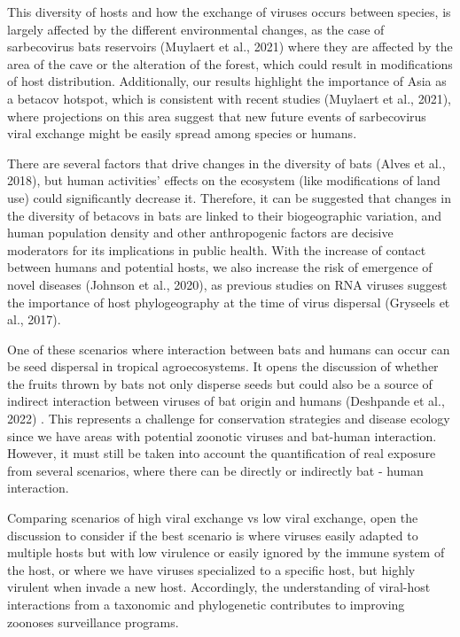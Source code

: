 \documentclass[10pt,oneside]{article}
\begin{document}
This diversity of hosts and how the exchange of viruses occurs between
species, is largely affected by the different environmental changes, as
the case of sarbecovirus bats reservoirs (Muylaert et al., 2021) where
they are affected by the area of the cave or the alteration of the
forest, which could result in modifications of host distribution.
Additionally, our results highlight the importance of Asia as a betacov
hotspot, which is consistent with recent studies (Muylaert et al.,
2021), where projections on this area suggest that new future events of
sarbecovirus viral exchange might be easily spread among species or
humans.

There are several factors that drive changes in the diversity of bats
(Alves et al., 2018), but human activities' effects on the ecosystem
(like modifications of land use) could significantly decrease it.
Therefore, it can be suggested that changes in the diversity of betacovs
in bats are linked to their biogeographic variation, and human
population density and other anthropogenic factors are decisive
moderators for its implications in public health. With the increase of
contact between humans and potential hosts, we also increase the risk of
emergence of novel diseases (Johnson et al., 2020), as previous studies
on RNA viruses suggest the importance of host phylogeography at the time
of virus dispersal (Gryseels et al., 2017).

One of these scenarios where interaction between bats and humans can
occur can be seed dispersal in tropical agroecosystems. It opens the
discussion of whether the fruits thrown by bats not only disperse seeds
but could also be a source of indirect interaction between viruses of
bat origin and humans (Deshpande et al., 2022) . This represents a
challenge for conservation strategies and disease ecology since we have
areas with potential zoonotic viruses and bat-human interaction.
However, it must still be taken into account the quantification of real
exposure from several scenarios, where there can be directly or
indirectly bat - human interaction.

Comparing scenarios of high viral exchange vs low viral exchange, open
the discussion to consider if the best scenario is where viruses easily
adapted to multiple hosts but with low virulence or easily ignored by
the immune system of the host, or where we have viruses specialized to a
specific host, but highly virulent when invade a new host. Accordingly,
the understanding of viral-host interactions from a taxonomic and
phylogenetic contributes to improving zoonoses surveillance programs.
\end{document}
